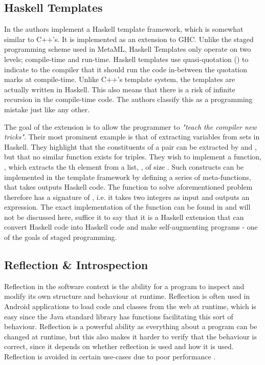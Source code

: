 \subsection{Haskell Templates}
In \cite{sheard2002template} the authors implement a Haskell template framework, which is somewhat similar to C++'s. It is implemented as an extension to \ac{GHC}. Unlike the staged programming scheme used in MetaML, Haskell Templates only operate on two levels; compile-time and run-time. Haskell templates use quasi-quotation (\ttt{[| code |]}) to indicate to the compiler that it should run the code in-between the quotation marks at compile-time. Unlike C++'s template system, the templates are actually written in Haskell. This also means that there is a risk of infinite recursion in the compile-time code. The authors classify this as a programming mistake just like any other.

The goal of the extension is to allow the programmer to \textit{"teach the compiler new tricks"}. Their most prominent example is that of extracting variables from sets in Haskell. They highlight that the constituents of a pair can be extracted by  and , but that no similar function exists for triples. They wish to implement a function, , which extracts the th element from a list, , of size . Such constructs can be implemented in the template framework by defining a series of meta-functions, that takes outputs Haskell code. The function to solve aforementioned problem therefore has a signature of , i.e. it takes two integers as input and outputs an expression. The exact implementation of the function can be found in \cite{sheard2002template} and will not be discussed here, suffice it to say that it is a Haskell extension that can convert Haskell code into Haskell code and make self-augmenting programs - one of the goals of staged programming.

\subsection{Reflection \& Introspection}
Reflection in the software context is the ability for a program to inspect and modify its own structure and behaviour at runtime. Reflection is often used in Android applications \cite{malte2017static} to load code and classes from the web at runtime, which is easy since the Java standard library has functions facilitating this sort of behaviour. Reflection is a powerful ability as everything about a program can be changed at runtime, but this also makes it harder to verify that the behaviour is correct, since it depends on whether reflection is used and how it is used. Reflection is avoided in certain use-cases due to poor performance \cite{java:refl, csharp:refl}.
 